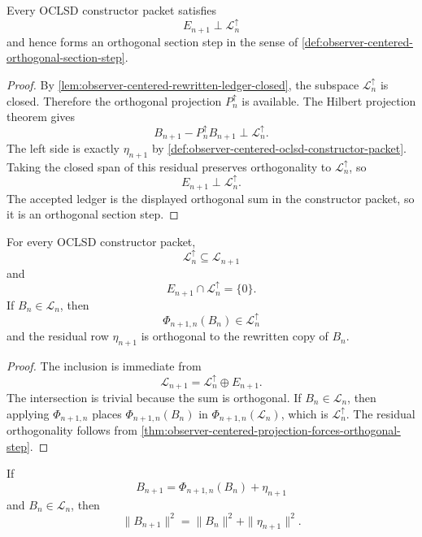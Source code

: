 \begin{theorem}
\label{thm:observer-centered-projection-forces-orthogonal-step}
Every OCLSD constructor packet satisfies
$$
E_{n+1}\perp\mathcal L_n^{\uparrow}
$$
and hence forms an orthogonal section step in the sense of
\autoref{def:observer-centered-orthogonal-section-step}.
\end{theorem}

\begin{proof}
By \autoref{lem:observer-centered-rewritten-ledger-closed}, the subspace
$\mathcal L_n^{\uparrow}$ is closed. Therefore the orthogonal projection
$P_n^{\uparrow}$ is available. The Hilbert projection theorem gives
$$
B_{n+1}-P_n^{\uparrow}B_{n+1}
\perp
\mathcal L_n^{\uparrow}.
$$
The left side is exactly $\eta_{n+1}$ by
\autoref{def:observer-centered-oclsd-constructor-packet}. Taking the
closed span of this residual preserves orthogonality to
$\mathcal L_n^{\uparrow}$, so
$$
E_{n+1}\perp\mathcal L_n^{\uparrow}.
$$
The accepted ledger is the displayed orthogonal sum in the constructor
packet, so it is an orthogonal section step.
\end{proof}

\begin{corollary}
\label{cor:observer-centered-old-ledger-inclusion-residual-separation}
For every OCLSD constructor packet,
$$
\mathcal L_n^{\uparrow}\subseteq\mathcal L_{n+1}
$$
and
$$
E_{n+1}\cap\mathcal L_n^{\uparrow}=\{0\}.
$$
If $B_n\in\mathcal L_n$, then
$$
\Phi_{n+1,n}(B_n)\in\mathcal L_n^{\uparrow}
$$
and the residual row $\eta_{n+1}$ is orthogonal to the rewritten copy of
$B_n$.
\end{corollary}

\begin{proof}
The inclusion is immediate from
$$
\mathcal L_{n+1}
=
\mathcal L_n^{\uparrow}\oplus E_{n+1}.
$$
The intersection is trivial because the sum is orthogonal. If
$B_n\in\mathcal L_n$, then applying $\Phi_{n+1,n}$ places
$\Phi_{n+1,n}(B_n)$ in $\Phi_{n+1,n}(\mathcal L_n)$, which is
$\mathcal L_n^{\uparrow}$. The residual orthogonality follows from
\autoref{thm:observer-centered-projection-forces-orthogonal-step}.
\end{proof}

\begin{corollary}
\label{cor:observer-centered-constructor-pythagorean-row}
If
$$
B_{n+1}=\Phi_{n+1,n}(B_n)+\eta_{n+1}
$$
and $B_n\in\mathcal L_n$, then
$$
\|B_{n+1}\|^2
=
\|B_n\|^2+\|\eta_{n+1}\|^2.
$$
\end{corollary}

